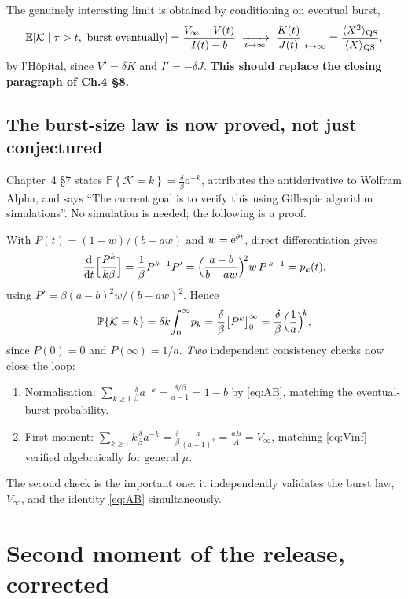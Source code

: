\documentclass[11pt]{article}
\newcommand{\dd}{{\rm d}}
\newcommand{\ee}{{\rm e}}
\newcommand{\E}{\mathbb{E}}
\newcommand{\Prob}[1]{\mathbb{P}\!\left\{#1\right\}}
\newcommand{\Kb}{\mathcal{K}}
\newcommand{\Aa}{A}
\newcommand{\Bb}{B}
\theoremstyle{plain}
\theoremstyle{definition}
\theoremstyle{remark}
\begin{document}
The genuinely interesting limit is obtained by conditioning on eventual burst,
\begin{equation}
\E[\Kb\mid \tau>t,\ \text{burst eventually}]=\frac{V_\infty-V(t)}{I(t)-b}
\;\xrightarrow[t\to\infty]{}\;\frac{K(t)}{J(t)}\Big|_{t\to\infty}
=\frac{\langle X^2\rangle_{\rm QS}}{\langle X\rangle_{\rm QS}},
\end{equation}
by l'H\^opital, since $V'=\delta K$ and $I'=-\delta J$. \textbf{This should replace
the closing paragraph of Ch.4 \S8.}

\subsection{The burst-size law is now proved, not just conjectured}

Chapter~4 \S7 states $\Prob{\Kb=k}=\frac{\delta}{\beta}a^{-k}$, attributes the
antiderivative to Wolfram Alpha, and says ``The current goal is to verify this using
Gillespie algorithm simulations''. No simulation is needed; the following is a proof.

With $P(t)=(1-w)/(b-aw)$ and $w=\ee^{\theta t}$, direct differentiation gives
\begin{equation}
\frac{\dd}{\dd t}\Bigl[\frac{P^k}{k\beta}\Bigr]
=\frac{1}{\beta}P^{k-1}P'
=\Bigl(\frac{a-b}{b-aw}\Bigr)^{\!2}w\,P^{\,k-1}=p_k(t),
\end{equation}
using $P'=\beta(a-b)^2w/(b-aw)^2$. Hence
\begin{equation}
\Prob{\Kb=k}=\delta k\!\int_0^\infty\! p_k
=\frac{\delta}{\beta}\bigl[P^k\bigr]_0^\infty
=\frac{\delta}{\beta}\Bigl(\frac1a\Bigr)^{\!k},
\end{equation}
since $P(0)=0$ and $P(\infty)=1/a$. \emph{Two} independent consistency checks now close
the loop:
\begin{enumerate}[leftmargin=1.6em,itemsep=0.15em]
\item Normalisation: $\sum_{k\ge1}\frac{\delta}{\beta}a^{-k}=\frac{\delta/\beta}{a-1}=1-b$
by \eqref{eq:AB}, matching the eventual-burst probability.
\item First moment: $\sum_{k\ge1}k\frac{\delta}{\beta}a^{-k}
=\frac{\delta}{\beta}\frac{a}{(a-1)^2}=\frac{a\Bb}{\Aa}=V_\infty$,
matching \eqref{eq:Vinf} --- verified algebraically for general $\mu$.
\end{enumerate}
The second check is the important one: it independently validates the burst law,
$V_\infty$, and the identity \eqref{eq:AB} simultaneously.

\section{Second moment of the release, corrected}
\end{document}
